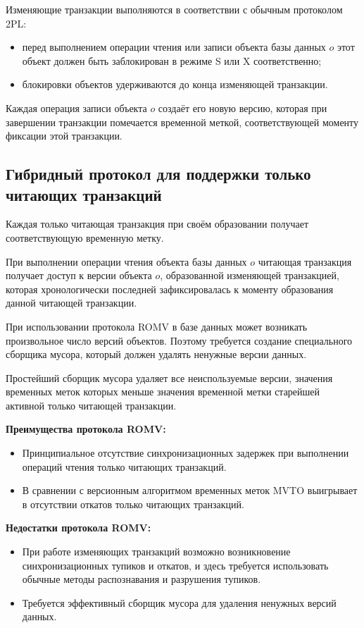 \documentclass[a4paper,12pt]{article}
\begin{document}
Изменяющие транзакции выполняются в соответствии с обычным протоколом 2PL:
\begin{itemize}
    \item перед выполнением операции чтения или записи объекта базы данных $o$ этот объект должен быть заблокирован в режиме S или X соответственно;
    \item блокировки объектов удерживаются до конца изменяющей транзакции.
\end{itemize}

Каждая операция записи объекта $o$ создаёт его новую версию, которая при завершении транзакции помечается временной меткой, соответствующей моменту фиксации этой транзакции.

\subsection{Гибридный протокол для поддержки только читающих транзакций}

Каждая только читающая транзакция при своём образовании получает соответствующую временную метку.

При выполнении операции чтения объекта базы данных $o$ читающая транзакция получает доступ к версии объекта $o$, образованной изменяющей транзакцией, которая хронологически последней зафиксировалась к моменту образования данной читающей транзакции.

При использовании протокола ROMV в базе данных может возникать произвольное число версий объектов. Поэтому требуется создание специального сборщика мусора, который должен удалять ненужные версии данных.

Простейший сборщик мусора удаляет все неиспользуемые версии, значения временных меток которых меньше значения временной метки старейшей активной только читающей транзакции.

\textbf{Преимущества протокола ROMV:}
\begin{itemize}
    \item Принципиальное отсутствие синхронизационных задержек при выполнении операций чтения только читающих транзакций.
    \item В сравнении с версионным алгоритмом временных меток MVTO выигрывает в отсутствии откатов только читающих транзакций.
\end{itemize}

\textbf{Недостатки протокола ROMV:}
\begin{itemize}
    \item При работе изменяющих транзакций возможно возникновение синхронизационных тупиков и откатов, и здесь требуется использовать обычные методы распознавания и разрушения тупиков.
    \item Требуется эффективный сборщик мусора для удаления ненужных версий данных.
\end{itemize}
\end{document}
